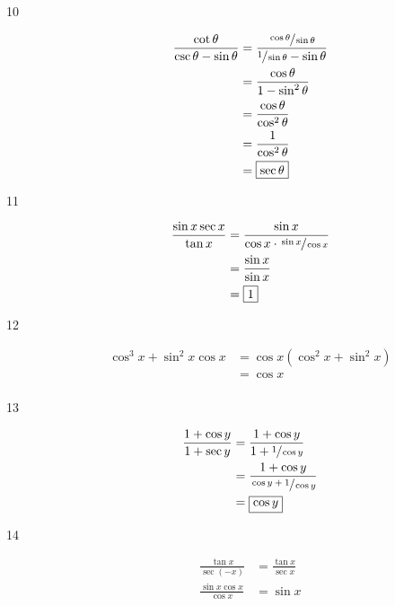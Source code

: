 \documentclass{exam}
\begin{document}
\begin{description}
      \item[10] 
        \begin{align*}
          \frac{\cot \theta}{\csc \theta - \sin \theta} & = \frac{\sfrac{\cos \theta}{\sin \theta}}{\sfrac{1}{\sin \theta} - \sin \theta} \\
                                                        & = \frac{\cos \theta}{1 - \sin^2 \theta} \\
                                                        & = \frac{\cos \theta}{\cos^2 \theta} \\
                                                        & = \frac{1}{\cos^2 \theta} \\
                                                        & = \boxed{ \sec \theta } \\
        \end{align*}

      \item[11] 
        \begin{align*}
          \frac{\sin x \sec x}{\tan x} & = \frac{\sin x}{\cos x \cdot \sfrac{\sin x}{\cos x}} \\
                                       & = \frac{\sin x}{\sin x} \\
                                       & = \boxed{ 1 } \\
        \end{align*}

      \item[12] 
        \begin{align*}
          \cos^3 x + \sin^2 x \cos x & = \cos x \left( \cos^2 x + \sin^2 x \right) \\
                                     & = \boxed{ \cos x } \\
        \end{align*}

      \item[13] 
        \begin{align*}
          \frac{1 + \cos y}{1 + \sec y} & = \frac{1 + \cos y}{1 + \sfrac{1}{\cos y}} \\
                                        & = \frac{1 + \cos y}{\sfrac{\cos y + 1}{\cos y}} \\
                                        & = \boxed{ \cos y } \\
        \end{align*}

      \item[14] 
        \begin{align*}
          \frac{\tan x}{\sec(-x)}      & = \frac{\tan x}{\sec x} \\
          \frac{\sin x \cos x}{\cos x} & = \boxed{ \sin x } \\
        \end{align*}


\end{description}
\end{document}
